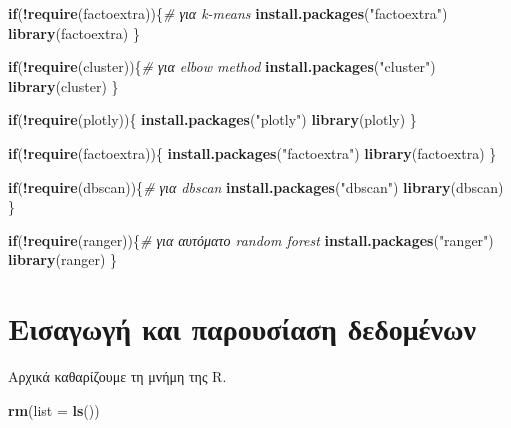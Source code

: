 \documentclass[
]{article}
\newenvironment{Shaded}{\begin{snugshade}}{\end{snugshade}}
\newcommand{\AttributeTok}[1]{\textcolor[rgb]{0.13,0.29,0.53}{#1}}
\newcommand{\CommentTok}[1]{\textcolor[rgb]{0.56,0.35,0.01}{\textit{#1}}}
\newcommand{\ControlFlowTok}[1]{\textcolor[rgb]{0.13,0.29,0.53}{\textbf{#1}}}
\newcommand{\FunctionTok}[1]{\textcolor[rgb]{0.13,0.29,0.53}{\textbf{#1}}}
\newcommand{\NormalTok}[1]{#1}
\newcommand{\SpecialCharTok}[1]{\textcolor[rgb]{0.81,0.36,0.00}{\textbf{#1}}}
\newcommand{\StringTok}[1]{\textcolor[rgb]{0.31,0.60,0.02}{#1}}
\begin{document}
\begin{Shaded}
\begin{Highlighting}[]
\ControlFlowTok{if}\NormalTok{(}\SpecialCharTok{!}\FunctionTok{require}\NormalTok{(factoextra))\{}\CommentTok{\# για k{-}means}
    \FunctionTok{install.packages}\NormalTok{(}\StringTok{"factoextra"}\NormalTok{)}
    \FunctionTok{library}\NormalTok{(factoextra)}
\NormalTok{\}}

\ControlFlowTok{if}\NormalTok{(}\SpecialCharTok{!}\FunctionTok{require}\NormalTok{(cluster))\{}\CommentTok{\# για elbow method}
    \FunctionTok{install.packages}\NormalTok{(}\StringTok{"cluster"}\NormalTok{)}
    \FunctionTok{library}\NormalTok{(cluster)}
\NormalTok{\}}

\ControlFlowTok{if}\NormalTok{(}\SpecialCharTok{!}\FunctionTok{require}\NormalTok{(plotly))\{}
    \FunctionTok{install.packages}\NormalTok{(}\StringTok{"plotly"}\NormalTok{)}
    \FunctionTok{library}\NormalTok{(plotly)}
\NormalTok{\}}

\ControlFlowTok{if}\NormalTok{(}\SpecialCharTok{!}\FunctionTok{require}\NormalTok{(factoextra))\{}
    \FunctionTok{install.packages}\NormalTok{(}\StringTok{"factoextra"}\NormalTok{)}
    \FunctionTok{library}\NormalTok{(factoextra)}
\NormalTok{\}}

\ControlFlowTok{if}\NormalTok{(}\SpecialCharTok{!}\FunctionTok{require}\NormalTok{(dbscan))\{}\CommentTok{\# για dbscan}
    \FunctionTok{install.packages}\NormalTok{(}\StringTok{"dbscan"}\NormalTok{)}
    \FunctionTok{library}\NormalTok{(dbscan)}
\NormalTok{\}}

\ControlFlowTok{if}\NormalTok{(}\SpecialCharTok{!}\FunctionTok{require}\NormalTok{(ranger))\{}\CommentTok{\# για αυτόματο random forest}
    \FunctionTok{install.packages}\NormalTok{(}\StringTok{"ranger"}\NormalTok{)}
    \FunctionTok{library}\NormalTok{(ranger)}
\NormalTok{\}}
\end{Highlighting}
\end{Shaded}

\section{Εισαγωγή και παρουσίαση
δεδομένων}\label{ux3b5ux3b9ux3c3ux3b1ux3b3ux3c9ux3b3ux3ae-ux3baux3b1ux3b9-ux3c0ux3b1ux3c1ux3bfux3c5ux3c3ux3afux3b1ux3c3ux3b7-ux3b4ux3b5ux3b4ux3bfux3bcux3adux3bdux3c9ux3bd}

Αρχικά καθαρίζουμε τη μνήμη της R.

\begin{Shaded}
\begin{Highlighting}[]
\FunctionTok{rm}\NormalTok{(}\AttributeTok{list =} \FunctionTok{ls}\NormalTok{())}
\end{Highlighting}
\end{Shaded}
\end{document}

